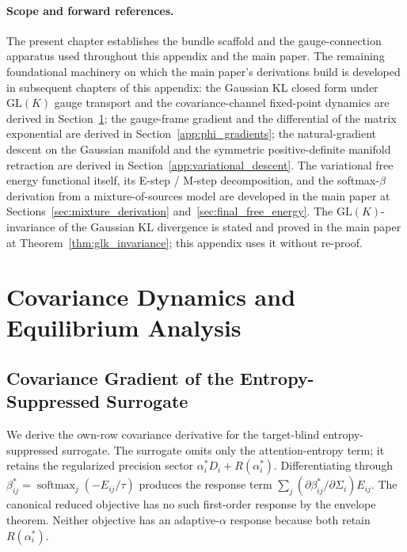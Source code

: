 \documentclass[twoside,11pt]{article}
\begin{document}
\paragraph{Scope and forward references.} The present chapter establishes the bundle scaffold and the gauge-connection apparatus used throughout this appendix and the main paper. The remaining foundational machinery on which the main paper's derivations build is developed in subsequent chapters of this appendix: the Gaussian KL closed form under $\mathrm{GL}(K)$ gauge transport and the covariance-channel fixed-point dynamics are derived in Section~\ref{app:covariance_dynamics}; the gauge-frame gradient and the differential of the matrix exponential are derived in Section~\ref{app:phi_gradients}; the natural-gradient descent on the Gaussian manifold and the symmetric positive-definite manifold retraction are derived in Section~\ref{app:variational_descent}. The variational free energy functional itself, its E-step / M-step decomposition, and the softmax-$\beta$ derivation from a mixture-of-sources model are developed in the main paper at Sections~\ref{sec:mixture_derivation} and~\ref{sec:final_free_energy}. The $\mathrm{GL}(K)$-invariance of the Gaussian KL divergence is stated and proved in the main paper at Theorem~\ref{thm:glk_invariance}; this appendix uses it without re-proof.



\section{Covariance Dynamics and Equilibrium Analysis}
\label{app:covariance_dynamics}

\subsection{Covariance Gradient of the Entropy-Suppressed Surrogate}

We derive the own-row covariance derivative for the target-blind entropy-suppressed surrogate. The surrogate omits only the attention-entropy term; it retains the regularized precision sector $\alpha_i^*D_i+R(\alpha_i^*)$. Differentiating through $\beta_{ij}^*=\operatorname{softmax}_j(-E_{ij}/\tau)$ produces the response term $\sum_j(\partial\beta_{ij}^*/\partial\Sigma_i)E_{ij}$. The canonical reduced objective has no such first-order response by the envelope theorem. Neither objective has an adaptive-$\alpha$ response because both retain $R(\alpha_i^*)$.
\end{document}
